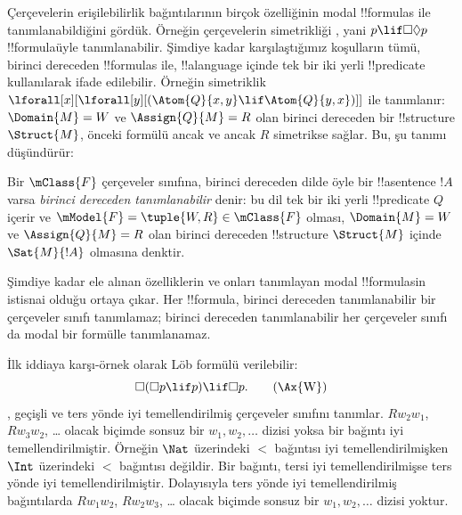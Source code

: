\documentclass[../../../include/open-logic-section]{subfiles}
\begin{document}


Çerçevelerin erişilebilirlik bağıntılarının birçok özelliğinin modal
!!{formula}s ile tanımlanabildiğini gördük. Örneğin çerçevelerin simetrikliği
, yani $p\lif\Box\Diamond p$ !!{formula}{}üyle tanımlanabilir. Şimdiye
kadar karşılaştığımız koşulların tümü, birinci dereceden !!{formula}s ile,
!!a{language} içinde tek bir iki yerli !!{predicate} kullanılarak ifade edilebilir.
Örneğin simetriklik $\lforall[x][\lforall[y][(\Atom{Q}{x,y}\lif
\Atom{Q}{y,x})]]$ ile tanımlanır: $\Domain{M}=W$ ve $\Assign{Q}{M}=R$
olan birinci dereceden bir !!{structure} $\Struct{M}$, önceki formülü ancak
ve ancak $R$ simetrikse sağlar. Bu, şu tanımı düşündürür:

\begin{defn}
  Bir $\mClass{F}$ çerçeveler sınıfına, birinci dereceden dilde öyle bir
  !!a{sentence} $!A$ varsa \emph{birinci dereceden tanımlanabilir} denir:
  bu dil tek bir iki yerli !!{predicate} $Q$ içerir ve
  $\mModel{F}=\tuple{W,R}\in\mClass{F}$ olması,
  $\Domain{M}=W$ ve $\Assign{Q}{M}=R$ olan birinci dereceden
  !!{structure} $\Struct{M}$ içinde $\Sat{M}{!A}$ olmasına denktir.
\end{defn}

Şimdiye kadar ele alınan özelliklerin ve onları tanımlayan modal
!!{formula}s{}in istisnai olduğu ortaya çıkar. Her !!{formula}, birinci
dereceden tanımlanabilir bir çerçeveler sınıfı tanımlamaz; birinci dereceden
tanımlanabilir her çerçeveler sınıfı da modal bir formülle tanımlanamaz.

İlk iddiaya karşı-örnek olarak L\"ob formülü verilebilir:
\begin{equation}
\Box(\Box p \lif p) \lif \Box p. \tag{\Ax{W}}
\end{equation}
, geçişli ve ters yönde iyi temellendirilmiş çerçeveler sınıfını
tanımlar. $Rw_2w_1$, $Rw_3w_2$, \dots{} olacak biçimde sonsuz bir
$w_1,w_2,\dots$ dizisi yoksa bir bağıntı iyi temellendirilmiştir. Örneğin
$\Nat$ üzerindeki $<$ bağıntısı iyi temellendirilmişken $\Int$ üzerindeki
$<$ bağıntısı değildir. Bir bağıntı, tersi iyi temellendirilmişse ters yönde
iyi temellendirilmiştir. Dolayısıyla ters yönde iyi temellendirilmiş
bağıntılarda $Rw_1w_2$, $Rw_2w_3$, \dots{} olacak biçimde sonsuz bir
$w_1,w_2,\dots$ dizisi yoktur.
\end{document}

